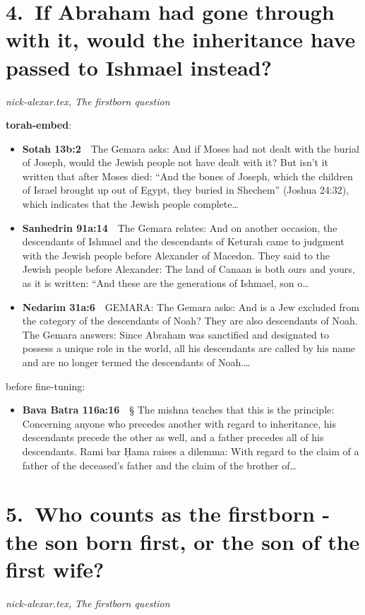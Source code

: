 \documentclass[11pt,a4paper]{article}
\begin{document}
\section*{4.\ If Abraham had gone through with it, would the inheritance have passed to Ishmael instead?}
{\color{quiet}\small\textit{nick-alexar.tex, The firstborn question}}

{\color{quiet}\small\textbf{torah-embed}:}
\begin{itemize}[leftmargin=1.2em,itemsep=3pt]
\item {\color{ref}\textbf{Sotah 13b:2}}\ \ The Gemara asks: And if Moses had not dealt with the burial of Joseph, would the Jewish people not have dealt with it? But isn’t it written that after Moses died: “And the bones of Joseph, which the children of Israel brought up out of Egypt, they buried in Shechem” (Joshua 24:32), which indicates that the Jewish people complete\ldots
\item {\color{ref}\textbf{Sanhedrin 91a:14}}\ \ The Gemara relates: And on another occasion, the descendants of Ishmael and the descendants of Keturah came to judgment with the Jewish people before Alexander of Macedon. They said to the Jewish people before Alexander: The land of Canaan is both ours and yours, as it is written: “And these are the generations of Ishmael, son o\ldots
\item {\color{ref}\textbf{Nedarim 31a:6}}\ \ GEMARA: The Gemara asks: And is a Jew excluded from the category of the descendants of Noah? They are also descendants of Noah. The Gemara answers: Since Abraham was sanctified and designated to possess a unique role in the world, all his descendants are called by his name and are no longer termed the descendants of Noah.\ldots
\end{itemize}
{\color{quiet}\small before fine-tuning:}
\begin{itemize}[leftmargin=1.2em]
\item {\color{ref}\textbf{Bava Batra 116a:16}}\ \ § The mishna teaches that this is the principle: Concerning anyone who precedes another with regard to inheritance, his descendants precede the other as well, and a father precedes all of his descendants. Rami bar Ḥama raises a dilemma: With regard to the claim of a father of the deceased’s father and the claim of the brother of\ldots
\end{itemize}

\section*{5.\ Who counts as the firstborn - the son born first, or the son of the first wife?}
{\color{quiet}\small\textit{nick-alexar.tex, The firstborn question}}
\end{document}

